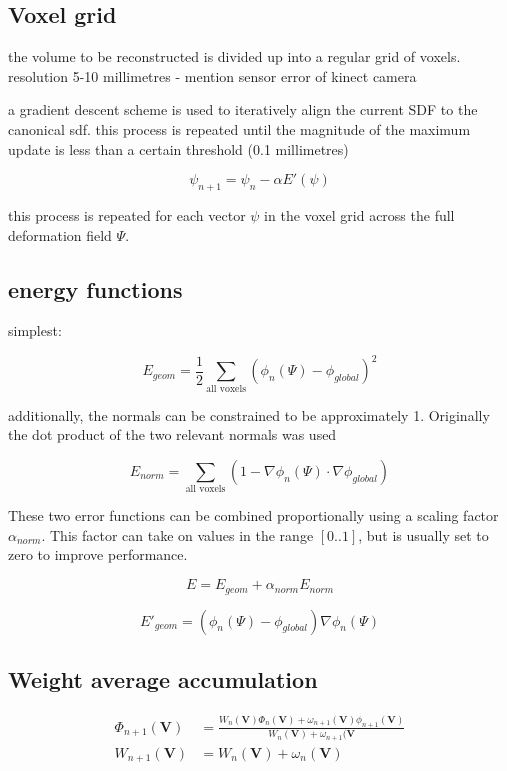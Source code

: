 \documentclass[12pt,twoside]{report}
\begin{document}
\subsection{Voxel grid}

the volume to be reconstructed is divided up into a regular grid of voxels. resolution 5-10 millimetres - mention sensor error of kinect camera

a gradient descent scheme is used to iteratively align the current SDF to the canonical sdf. this process is repeated until the magnitude of the maximum update is less than a certain threshold (0.1 millimetres)

$$\psi_{n+1} = \psi_{n} - \alpha E'(\psi)$$

this process is repeated for each vector $\psi$ in the voxel grid across the full deformation field $\Psi$.



\subsection{energy functions}

simplest:

$$ E_{geom} = \frac{1}{2} \sum\limits_{\textrm{all voxels}} (\phi_n(\Psi) - \phi_{global})^2  $$


additionally, the normals can be constrained to be approximately 1. Originally the dot product of the two relevant normals was used

$$ E_{norm} = \sum\limits_{\textrm{all voxels}}(1 - \nabla \phi_n(\Psi) \cdot \nabla\phi_{global}) $$

These two error functions can be combined proportionally using a scaling factor $\alpha_{norm}$. This factor can take on values in the range $[0..1]$, but is usually set to zero to improve performance.

$$E = E_{geom} + \alpha_{norm}E_{norm}$$

$$ E'_{geom} = (\phi_n(\Psi) - \phi_{global}) \nabla \phi_n(\Psi)$$
\subsection{Weight average accumulation}

\begin{align*}
\Phi_{n+1}(\textbf{V}) &= \frac{W_n(\textbf{V})\Phi_n(\textbf{V}) + \omega_{n+1}(\textbf{V})\phi_{n+1}(\textbf{V})}{W_{n}(\textbf{V}) + \omega_{n+1}(\textbf{V}}\\
W_{n+1}(\textbf{V}) &= W_n(\textbf{V}) + \omega_n(\textbf{V}) \\
\end{align*}
\end{document}
